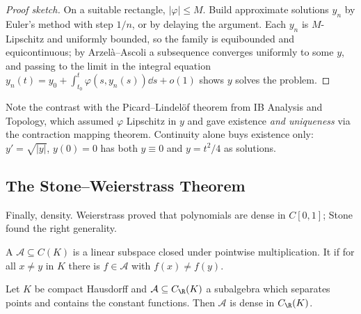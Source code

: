 \begin{proof}[Proof sketch]
	On a suitable rectangle, $|\varphi| \leq M$. Build approximate solutions $y_n$ by Euler's method with step $1/n$, or by delaying the argument. Each $y_n$ is $M$-Lipschitz and uniformly bounded, so the family is equibounded and equicontinuous; by Arzelà--Ascoli a subsequence converges uniformly to some $y$, and passing to the limit in the integral equation $y_n(t) = y_0 + \int_{t_0}^t \varphi(s,y_n(s))\dd s + o(1)$ shows $y$ solves the problem.
\end{proof}

Note the contrast with the Picard--Lindelöf theorem from IB Analysis and Topology, which assumed $\varphi$ Lipschitz in $y$ and gave existence \emph{and uniqueness} via the contraction mapping theorem. Continuity alone buys existence only: $y' = \sqrt{|y|}$, $y(0)=0$ has both $y \equiv 0$ and $y = t^2/4$ as solutions.

\subsection{The Stone--Weierstrass Theorem}

Finally, density. Weierstrass proved that polynomials are dense in $C[0,1]$; Stone found the right generality.

\begin{definition}[Subalgebra]
	A  $\mathcal{A} \subseteq C(K)$ is a linear subspace closed under pointwise multiplication. It  if for all $x \neq y$ in $K$ there is $f \in \mathcal{A}$ with $f(x)\neq f(y)$.
\end{definition}

\begin{theorem}
	Let $K$ be compact Hausdorff and $\mathcal{A} \subseteq C_\R(K)$ a subalgebra which separates points and contains the constant functions. Then $\mathcal{A}$ is dense in $C_\R(K)$.
\end{theorem}

